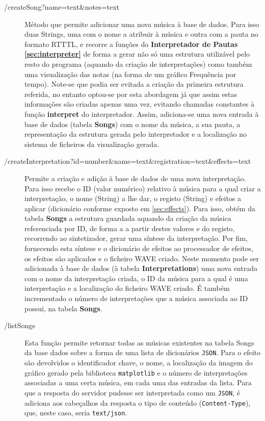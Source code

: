 \documentclass[a4paper,11pt,openright,oneside]{report}
\begin{document}
\begin{description}
\item[/createSong?name=text\&notes=text]
Método que permite adicionar uma nova música à base de dados. Para isso duas Strings, uma com o nome a atribuir à música e outra com a pauta no formato RTTTL, e recorre a funções do \textbf{Interpretador de Pautas \ref{sec:interpreter}} de forma a gerar não só uma estrutura utilizável pelo resto do programa (aquando da criação de interpretações) como também uma visualização das notas (na forma de um gráfico Frequência por tempo). Note-se que podia ser evitada a criação da primeira estrutura referida, no entanto optou-se por esta abordagem já que assim estas informações são criadas apenas uma vez, evitando chamadas constantes à função \textbf{interpret} do interpretador. Assim, adiciona-se uma nova entrada à base de dados (tabela \textbf{Songs}) com o nome da música, a sua pauta, a representação da estrutura gerada pelo interpretador e a localização no sistema de ficheiros da visualização gerada.
\item[/createInterpretation?id=number\&name=text\&registration=text\&effects=text]
Permite a criação e adição à base de dados de uma nova interpretação. Para isso recebe o ID (valor numérico) relativo à música para a qual criar a interpretação, o nome (String) a lhe dar, o registo (String) e efeitos a aplicar (dicionário conforme exposto em \ref{sec:effects}). Para isso, obtém da tabela \textbf{Songs} a estrutura guardada aquando da criação da música referenciada por ID, de forma a a partir destes valores e do registo, recorrendo ao sintetizador, gerar uma síntese da interpretação. Por fim, fornecendo esta síntese e o dicionário de efeitos ao processador de efeitos, os efeitos são aplicados e o ficheiro WAVE criado. Neste momento pode ser adicionada à base de dados (à tabela \textbf{Interpretations}) uma nova entrada com o nome da interpretação criada, o ID da música para a qual é uma interpretação e a localização do ficheiro WAVE criado. É também incrementado o número de interpretações que a música associada ao ID possui, na tabela \textbf{Songs}.
\item[/listSongs]
Esta função permite retornar todas as músicas existentes na tabela Songs da base dados sobre a forma de uma lista de dicionários \verb|JSON|. Para o efeito são devolvidos o identificador chave, o nome, a localização da imagem do gráfico gerado pela biblioteca \texttt{matplotlib} e o número de interpretações associadas a uma certa música, em cada uma das entradas da lista. Para que a resposta do servidor pudesse ser interpretada como um \verb|JSON|, é adiciona aos cabeçalhos da resposta o tipo de conteúdo (\texttt{Content-Type}), que, neste caso, seria \texttt{text/json}.

\end{description}
\end{document}
